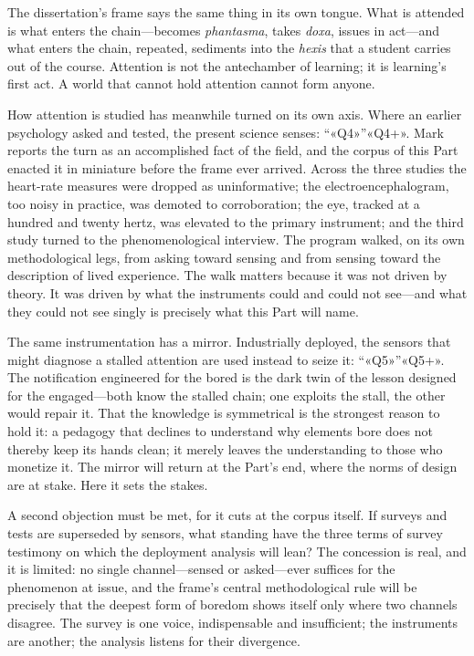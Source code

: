 The dissertation's frame says the same thing in its own tongue. What is attended is what enters the chain---becomes \textit{phantasma}, takes \textit{doxa}, issues in act---and what enters the chain, repeated, sediments into the \textit{hexis} that a student carries out of the course. Attention is not the antechamber of learning; it is learning's first act. A world that cannot hold attention cannot form anyone.

How attention is studied has meanwhile turned on its own axis. Where an earlier psychology asked and tested, the present science senses: ``«Q4»''«Q4+». Mark reports the turn as an accomplished fact of the field, and the corpus of this Part enacted it in miniature before the frame ever arrived. Across the three studies the heart-rate measures were dropped as uninformative; the electroencephalogram, too noisy in practice, was demoted to corroboration; the eye, tracked at a hundred and twenty hertz, was elevated to the primary instrument; and the third study turned to the phenomenological interview. The program walked, on its own methodological legs, from asking toward sensing and from sensing toward the description of lived experience. The walk matters because it was not driven by theory. It was driven by what the instruments could and could not see---and what they could not see singly is precisely what this Part will name.

The same instrumentation has a mirror. Industrially deployed, the sensors that might diagnose a stalled attention are used instead to seize it: ``«Q5»''«Q5+». The notification engineered for the bored is the dark twin of the lesson designed for the engaged---both know the stalled chain; one exploits the stall, the other would repair it. That the knowledge is symmetrical is the strongest reason to hold it: a pedagogy that declines to understand why elements bore does not thereby keep its hands clean; it merely leaves the understanding to those who monetize it. The mirror will return at the Part's end, where the norms of design are at stake. Here it sets the stakes.

A second objection must be met, for it cuts at the corpus itself. If surveys and tests are superseded by sensors, what standing have the three terms of survey testimony on which the deployment analysis will lean? The concession is real, and it is limited: no single channel---sensed or asked---ever suffices for the phenomenon at issue, and the frame's central methodological rule will be precisely that the deepest form of boredom shows itself only where two channels disagree. The survey is one voice, indispensable and insufficient; the instruments are another; the analysis listens for their divergence.

